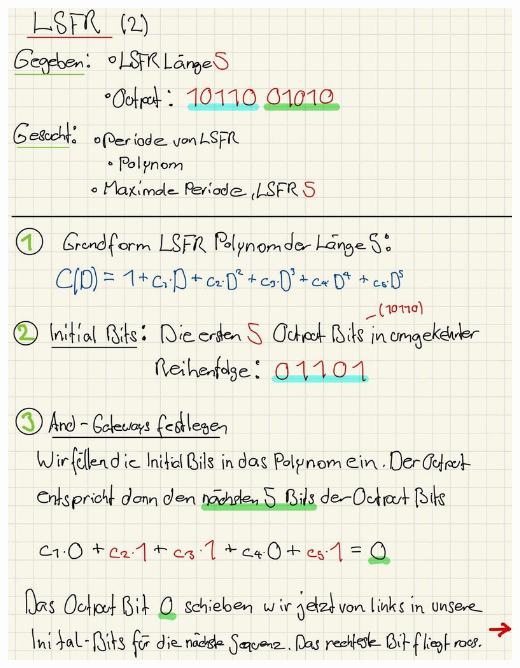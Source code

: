 \documentclass[11pt]{article}
\begin{document}
\begin{center}

	\includegraphics[scale=0.92]{img/lsfr2_1.jpg}\\
	

\end{center}
\end{document}
